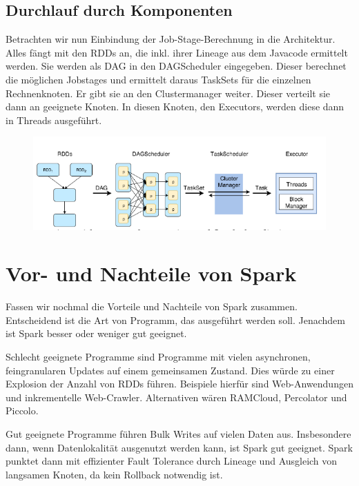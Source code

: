 \bigskip

\subsection[Durchlauf durch
Komponenten]{\rmfamily Durchlauf durch
Komponenten}
Betrachten wir nun Einbindung der Job-Stage-Berechnung in die
Architektur. Alles fängt mit den RDDs an, die inkl. ihrer Lineage aus
dem Javacode ermittelt werden. Sie werden als DAG in den DAGScheduler
eingegeben. Dieser berechnet die möglichen Jobstages und ermittelt
daraus TaskSets für die einzelnen Rechnenknoten. Er gibt sie an den
Clustermanager weiter. Dieser verteilt sie dann an geeignete Knoten. In
diesen Knoten, den Executors, werden diese dann in Threads ausgeführt. 

\begin{figure}
\centering
\includegraphics[width=\textwidth]{bilder/Seminartext-img3.png}
\end{figure}

\bigskip

\section[Vor{}- und Nachteile von
Spark]{\rmfamily Vor- und Nachteile von Spark}
Fassen wir nochmal die Vorteile und Nachteile von Spark zusammen.
Entscheidend ist die Art von Programm, das ausgeführt werden soll.
Jenachdem ist Spark besser oder weniger gut geeignet.

Schlecht geeignete Programme sind Programme mit vielen asynchronen,
feingranularen Updates auf einem gemeinsamen Zustand. Dies würde zu
einer Explosion der Anzahl von RDDs führen. Beispiele hierfür sind
Web-Anwendungen und inkrementelle Web-Crawler. Alternativen wären
RAMCloud, Percolator und Piccolo.

Gut geeignete Programme führen Bulk Writes auf vielen Daten aus.
Insbesondere dann, wenn Datenlokalität ausgenutzt werden kann, ist
Spark gut geeignet. Spark punktet dann mit effizienter Fault Tolerance
durch Lineage und Ausgleich von langsamen Knoten, da kein Rollback
notwendig ist.

